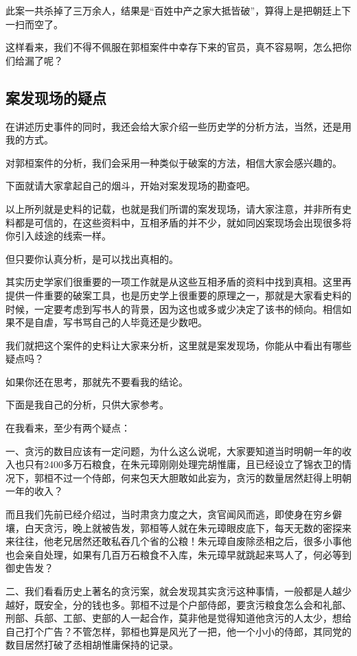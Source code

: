 \begin{multicols}{\theparacolNo}
		此案一共杀掉了三万余人，结果是“百姓中产之家大抵皆破”，算得上是把朝廷上下一扫而空了。

		这样看来，我们不得不佩服在郭桓案件中幸存下来的官员，真不容易啊，怎么把你们给漏了呢？

		\subsection{案发现场的疑点}
		在讲述历史事件的同时，我还会给大家介绍一些历史学的分析方法，当然，还是用我的方式。

		对郭桓案件的分析，我们会采用一种类似于破案的方法，相信大家会感兴趣的。

		下面就请大家拿起自己的烟斗，开始对案发现场的勘查吧。

		以上所列就是史料的记载，也就是我们所谓的案发现场，请大家注意，并非所有史料都是可信的，在这些资料中，互相矛盾的并不少，就如同凶案现场会出现很多将你引入歧途的线索一样。

		但只要你认真分析，是可以找出真相的。

		其实历史学家们很重要的一项工作就是从这些互相矛盾的资料中找到真相。这里再提供一件重要的破案工具，也是历史学上很重要的原理之一，那就是大家看史料的时候，一定要考虑到写书人的背景，因为这也或多或少决定了该书的倾向。相信如果不是自虐，写书骂自己的人毕竟还是少数吧。

		我们就把这个案件的史料让大家来分析，这里就是案发现场，你能从中看出有哪些疑点吗？

		如果你还在思考，那就先不要看我的结论。

		下面是我自己的分析，只供大家参考。

		在我看来，至少有两个疑点：

		一、贪污的数目应该有一定问题，为什么这么说呢，大家要知道当时明朝一年的收入也只有2400多万石粮食，在朱元璋刚刚处理完胡惟庸，且已经设立了锦衣卫的情况下，郭桓不过一个侍郎，何来包天大胆敢如此妄为，贪污的数量居然赶得上明朝一年的收入？

		而且我们先前已经介绍过，当时肃贪力度之大，贪官闻风而逃，即使身在穷乡僻壤，白天贪污，晚上就被告发，郭桓等人就在朱元璋眼皮底下，每天无数的密探来来往往，他老兄居然还敢私吞几个省的公粮！朱元璋自废除丞相之后，很多小事他也会亲自处理，如果有几百万石粮食不入库，朱元璋早就跳起来骂人了，何必等到御史告发？

		二、我们看看历史上著名的贪污案，就会发现其实贪污这种事情，一般都是人越少越好，既安全，分的钱也多。郭桓不过是个户部侍郎，要贪污粮食怎么会和礼部、刑部、兵部、工部、吏部的人一起合作，莫非他是觉得知道他贪污的人太少，想给自己打个广告？不管怎样，郭桓也算是风光了一把，他一个小小的侍郎，其同党的数目居然打破了丞相胡惟庸保持的记录。


\end{multicols}
